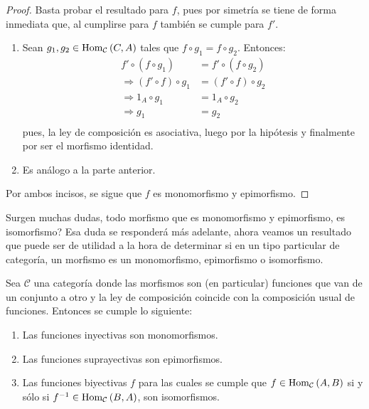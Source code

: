 \documentclass[12pt]{report}
\theoremstyle{largebreak}
\newcommand{\Hom}[3]{\ensuremath{\textup{Hom}_{#1}\left(#2,#3\right)}}
\begin{document}
    \begin{proof}
        Basta probar el resultado para $f$, pues por simetría se tiene de forma inmediata que, al cumplirse para $f$ también se cumple para $f'$.
        \begin{enumerate}
            \item Sean $g_1,g_2\in\Hom{\mathcal{C}}{C}{A}$ tales que $f\circ g_1=f\circ g_2$. Entonces:
            \begin{equation*}
                \begin{split}
                    f'\circ (f\circ g_1)&=f'\circ(f\circ g_2)\\
                    \Rightarrow(f'\circ f)\circ g_1&=(f'\circ f)\circ g_2\\
                    \Rightarrow 1_A\circ g_1&=1_A\circ g_2\\
                    \Rightarrow g_1&= g_2\\
                \end{split}
            \end{equation*}
            pues, la ley de composición es asociativa, luego por la hipótesis y finalmente por ser el morfismo identidad.
            \item Es análogo a la parte anterior.
        \end{enumerate}
        Por ambos incisos, se sigue que $f$ es monomorfismo y epimorfismo.

    \end{proof}

    Surgen muchas dudas, todo morfismo que es monomorfismo y epimorfismo, es isomorfismo? Esa duda se responderá más adelante, ahora veamos un resultado que puede ser de utilidad a la hora de determinar si en un tipo particular de categoría, un morfismo es un monomorfismo, epimorfismo o isomorfismo.

    \begin{propo}
        Sea $\mathcal{C}$ una categoría donde las morfismos son (en particular) funciones que van de un conjunto a otro y la ley de composición coincide con la composición usual de funciones. Entonces se cumple lo siguiente:
        \begin{enumerate}
            \item Las funciones inyectivas son monomorfismos.
            \item Las funciones suprayectivas son epimorfismos.
            \item Las funciones biyectivas $f$ para las cuales se cumple que $f\in \Hom{\mathcal{C}}{A}{B}$ si y sólo si $f^{-1}\in\Hom{\mathcal{C}}{B}{A}$, son isomorfismos. 
        \end{enumerate}
    \end{propo}
\end{document}
